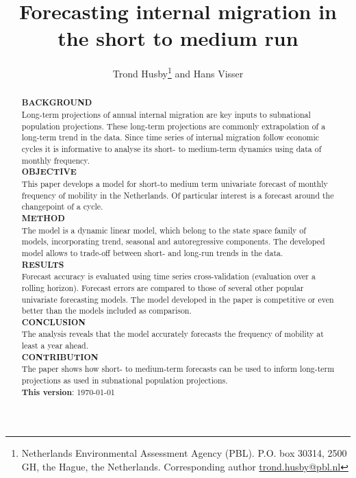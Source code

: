 \documentclass[12pt, a4paper]{article}
\begin{document}
\title{Forecasting internal migration in the short to medium run}

\author{Trond Husby\thanks{Netherlands Environmental Assessment Agency (PBL). P.O. box 30314, 2500 GH, the Hague, the Netherlands. Corresponding author \url{trond.husby@pbl.nl}} and Hans Visser\footnotemark[1]}
\date{}
\maketitle

\newpage

\begin{abstract}
  \noindent
  \textbf{BACKGROUND} \\
  Long-term projections of annual internal migration are key inputs to subnational population projections. These long-term projections are commonly extrapolation of a long-term trend in the data. Since time series of internal migration follow economic cycles it is informative to analyse its short- to medium-term dynamics using data of monthly frequency. \\
\textbf{OBJECTIVE} \\
This paper develops a model for short-to medium term univariate forecast of
monthly frequency of mobility in the Netherlands. Of particular interest is a forecast around the changepoint of a cycle. \\
\textbf{METHOD} \\
The model is a dynamic linear model, which belong to the state space family of models, incorporating trend, seasonal and autoregressive components. The developed model allows to trade-off between short- and long-run trends in the data. \\
\textbf{RESULTS} \\
Forecast accuracy is evaluated using time series cross-validation (evaluation over a rolling horizon). Forecast errors are compared to those of several other popular univariate forecasting models. The model developed in the paper is competitive or even better than the models included as comparison. \\
\textbf{CONCLUSION} \\
The analysis reveals that the model accurately forecasts the frequency of mobility at least a year ahead. \\
\textbf{CONTRIBUTION}\\
The paper shows how short- to medium-term forecasts can be used to inform long-term projections as used in subnational population projections. \\ 
\bigskip
\textbf{This version}: {\today}

\end{abstract}
\end{document}
